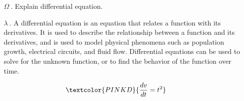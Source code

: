 \documentclass{article}
\begin{document}
\pagecolor{BLUE20}
\ttfamily
\sloppy
\vspace*{\fill}
\begin{itemize}
	\item[\textcolor{GREEN10}{$\Omega ~.$}]\textcolor{GREEN10}{Explain differential equation.}

	\item[\textcolor{WHITE01}{$\lambda ~.$}]\textcolor{WHITE01}{A differential equation is an equation that relates a function with its derivatives. It is used to describe the relationship between a function and its derivatives, and is used to model physical phenomena such as population growth, electrical circuits, and fluid flow. Differential equations can be used to solve for the unknown function, or to find the behavior of the function over time.\\[2 mm]}
\end{itemize}
\[
\textcolor{PINKD}{\dfrac{dv}{dt}=t^2}
\]
\centering{\textcolor{PINKD}{Here, rate of velocity is changing with respect to time as squared of time.}}
\vspace*{\fill}
\end{document}
